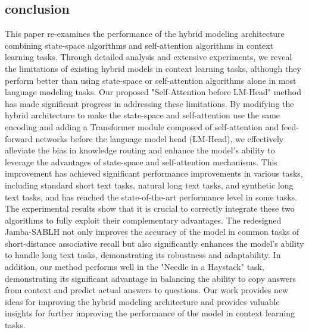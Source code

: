 \documentclass{article}
\theoremstyle{plain}
\theoremstyle{definition}
\theoremstyle{remark}
\begin{document}
\subsection{conclusion}

This paper re-examines the performance of the hybrid modeling architecture combining state-space algorithms and self-attention algorithms in context learning tasks. Through detailed analysis and extensive experiments, we reveal the limitations of existing hybrid models in context learning tasks, although they perform better than using state-space or self-attention algorithms alone in most language modeling tasks.
Our proposed "Self-Attention before LM-Head" method has made significant progress in addressing these limitations. By modifying the hybrid architecture to make the state-space and self-attention use the same encoding and adding a Transformer module composed of self-attention and feed-forward networks before the language model head (LM-Head), we effectively alleviate the bias in knowledge routing and enhance the model's ability to leverage the advantages of state-space and self-attention mechanisms. This improvement has achieved significant performance improvements in various tasks, including standard short text tasks, natural long text tasks, and synthetic long text tasks, and has reached the state-of-the-art performance level in some tasks.
The experimental results show that it is crucial to correctly integrate these two algorithms to fully exploit their complementary advantages. The redesigned Jamba-SABLH not only improves the accuracy of the model in common tasks of short-distance associative recall but also significantly enhances the model's ability to handle long text tasks, demonstrating its robustness and adaptability. In addition, our method performs well in the "Needle in a Haystack" task, demonstrating its significant advantage in balancing the ability to copy answers from context and predict actual answers to questions.
Our work provides new ideas for improving the hybrid modeling architecture and provides valuable insights for further improving the performance of the model in context learning tasks.
\end{document}

